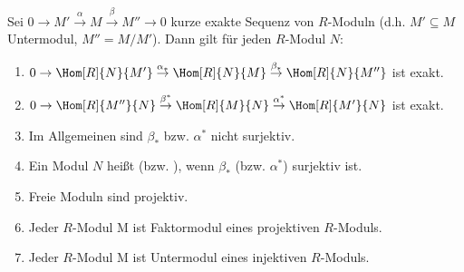 \begin{PropDef}
  Sei $0 \to M' \overset{\alpha}{\to} M \overset{\beta}{\to} M'' \to 0$ kurze exakte Sequenz von $R$-Moduln (d.h.
  $M' \subseteq M$ Untermodul, $M'' = M/M'$). Dann gilt für jeden $R$-Modul $N$:
  \begin{enumerate}
    \item $0 \to \Hom[R]{N}{M'} \overset{\alpha_*}{\to} \Hom[R]{N}{M} \overset{\beta_*}{\to}
          \Hom[R]{N}{M''}$ ist exakt.
    \item $0 \to \Hom[R]{M''}{N} \overset{\beta^*}{\to} \Hom[R]{M}{N} \overset{\alpha^*}{\to}
          \Hom[R]{M'}{N}$ ist exakt.
    \item Im Allgemeinen sind $\beta_*$ bzw. $\alpha^*$ nicht surjektiv.
    \item Ein Modul $N$ heißt  (bzw.
          ), wenn $\beta_*$ (bzw.
          $\alpha^*$) surjektiv ist.
    \item Freie Moduln sind projektiv.
    \item Jeder $R$-Modul M ist Faktormodul eines projektiven $R$-Moduls.
    \item Jeder $R$-Modul M ist Untermodul eines injektiven $R$-Moduls.
  \end{enumerate}
\end{PropDef}

